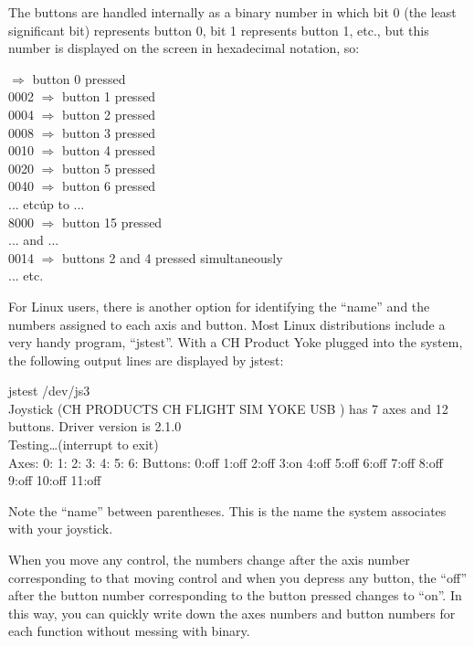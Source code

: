 The buttons are handled internally as a binary number in which bit 0 (the least significant bit) represents button 0, bit 1 represents button 1, etc., but this number is displayed on the screen in hexadecimal notation, so:
\medskip

 $\Rightarrow$ button 0 pressed\\
  0002 $\Rightarrow$ button 1 pressed\\
  0004 $\Rightarrow$ button 2 pressed\\
  0008 $\Rightarrow$ button 3 pressed\\
  0010 $\Rightarrow$ button 4 pressed\\
  0020 $\Rightarrow$ button 5 pressed\\
  0040 $\Rightarrow$ button 6 pressed\\
  ... etc\. up to ...\\
  8000 $\Rightarrow$ button 15 pressed\\
  ... and ...\\
  0014 $\Rightarrow$ buttons 2 and 4 pressed simultaneously\\
  ... etc.
  \medskip

For Linux users, there is another option for identifying the ``name'' and the numbers assigned to each axis and button.  Most Linux distributions include a very handy program, ``jstest''.  With a CH Product Yoke plugged into the system, the following output lines are displayed by jstest:
\medskip

\begin{ttfamily}
\tiny
\noindent
jstest /dev/js3\\
Joystick (CH PRODUCTS CH FLIGHT SIM YOKE USB ) has 7 axes and 12 buttons. Driver version is 2.1.0\\
Testing\ldots (interrupt to exit)\\
Axes:  0:   1:   2:  3:  4:  5:  6: Buttons:  0:off  1:off  2:off  3:on  4:off  5:off  6:off  7:off 8:off 9:off 10:off  11:off\\
\end{ttfamily}

\noindent
Note the ``name'' between parentheses.  This is the name the system associates with your joystick.

When you move any control, the numbers change after the axis number corresponding to that moving control and when you depress any button, the ``off'' after the button number corresponding to the button pressed changes to ``on''.  In this way, you can quickly write down the axes numbers and button numbers for each function without messing with binary.

